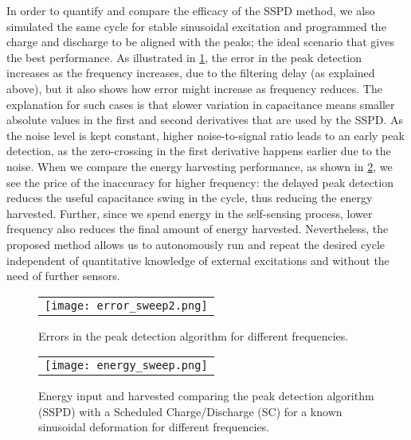 In order to quantify and compare the efficacy of the SSPD method, we also simulated the same cycle for stable sinusoidal excitation and programmed the charge and discharge to be aligned with the peaks; the ideal scenario that gives the best performance. As illustrated in \cref{fig:er_sweep}, the error in the peak detection increases as the frequency increases, due to the filtering delay (as explained above), but it also shows how error might increase as frequency reduces. The explanation for such cases is that slower variation in capacitance means smaller absolute values in the first and second derivatives that are used by the SSPD. As the noise level is kept constant, higher noise-to-signal ratio leads to an early peak detection, as the zero-crossing in the first derivative happens earlier due to the noise. 
When we compare the energy harvesting performance, as shown in \cref{fig:en_sweep}, we see the price of the inaccuracy for higher frequency: the delayed peak detection reduces the useful capacitance swing in the cycle, thus reducing the energy harvested. Further, since we spend energy in the self-sensing process, lower frequency also reduces the final amount of energy harvested. Nevertheless, the proposed method allows us to autonomously run and repeat the desired cycle independent of quantitative knowledge of external excitations and without the need of further sensors.
  
   
   
   \begin{figure} [ht]
   \begin{center}
   \begin{tabular}{c} %
   \texttt{[image: error\_sweep2.png]}
   \end{tabular}
   \end{center}
   \caption[example] 
   { \label{fig:er_sweep} 
Errors in the peak detection algorithm for different frequencies.}
   \end{figure}   
   
   \begin{figure} [ht]
   \begin{center}
   \begin{tabular}{c} %
   \texttt{[image: energy\_sweep.png]}
   \end{tabular}
   \end{center}
   \caption[example] 
   { \label{fig:en_sweep} 
 Energy input and harvested comparing the peak detection algorithm (SSPD) with a Scheduled Charge/Discharge (SC) for a known sinusoidal deformation for different frequencies.}
   \end{figure}   
   
